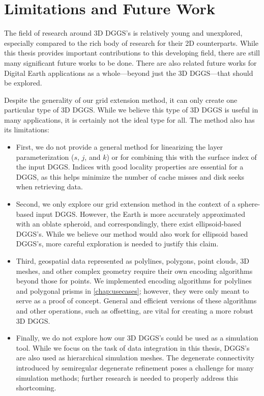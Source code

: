 \section{Limitations and Future Work}
The field of research around 3D DGGS's is relatively young and unexplored, especially compared to the rich body of research for their 2D counterparts.
While this thesis provides important contributions to this developing field, there are still many significant future works to be done.
There are also related future works for Digital Earth applications as a whole---beyond just the 3D DGGS---that should be explored.


Despite the generality of our grid extension method, it can only create one particular type of 3D DGGS.
While we believe this type of 3D DGGS is useful in many applications, it is certainly not the ideal type for all.
The method also has its limitations:
%
\begin{itemize}
	\item First, we do not provide a general method for linearizing the layer parameterization ($s$, $j$, and $k$) or for combining this with the surface index of the input DGGS.
	Indices with good locality properties are essential for a DGGS, as this helps minimize the number of cache misses and disk seeks when retrieving data.

	\item Second, we only explore our grid extension method in the context of a sphere-based input DGGS.
	However, the Earth is more accurately approximated with an oblate spheroid, and correspondingly, there exist ellipsoid-based DGGS's.
	While we believe our method would also work for ellipsoid based DGGS's, more careful exploration is needed to justify this claim.

	\item Third, geospatial data represented as polylines, polygons, point clouds, 3D meshes, and other complex geometry require their own encoding algorithms beyond those for points.
	We implemented encoding algorithms for polylines and polygonal prisms in \cref{chap:usecases}; however, they were only meant to serve as a proof of concept.
	General and efficient versions of these algorithms and other operations, such as offsetting, are vital for creating a more robust 3D DGGS.

	\item Finally, we do not explore how our 3D DGGS's could be used as a simulation tool.
	While we focus on the task of data integration in this thesis, DGGS's are also used as hierarchical simulation meshes.
	The degenerate connectivity introduced by semiregular degenerate refinement poses a challenge for many simulation methods; further research is needed to properly address this shortcoming.
\end{itemize}


